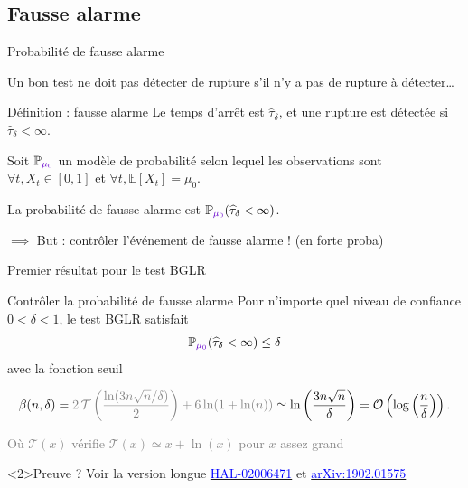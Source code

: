 \documentclass[11pt,french,ignorenonframetext,]{beamer}
\begin{document}
\subsection{\hfill{}Fausse alarme\hfill{}}

\begin{frame}{Probabilité de fausse alarme}

  Un bon test ne doit pas détecter de rupture s'il n'y a pas de rupture à détecter\ldots

  \pause
  \begin{block}{Définition : fausse alarme}
    Le temps d'arrêt est $\widehat{\tau}_\delta$,
    et une rupture est détectée si $\widehat{\tau}_\delta < \infty$.

    Soit $\mathbb{P}_{\textcolor{deeppurple}{\mu_0}}$ un modèle de probabilité selon lequel les observations sont $\forall t, X_t \in[0,1]$
    et \textcolor{deeppurple}{$\forall t, \mathbb{E}[X_t] = \mu_0$}.

    La \alert{probabilité de fausse alarme} est $\mathbb{P}_{\textcolor{deeppurple}{\mu_0}}(\widehat{\tau}_\delta < \infty)$.
  \end{block}

  \alert{$\implies$ But : contrôler l'événement de fausse alarme !} (en forte proba)

\end{frame}

\begin{frame}{Premier résultat pour le test BGLR \dSmiley{}}

  \begin{block}{Contrôler la probabilité de fausse alarme}
    Pour n'importe quel \alert{niveau de confiance} $0<\delta<1$,
    le test BGLR satisfait
    \[ \mathbb{P}_{\textcolor{deeppurple}{\mu_0}}(\widehat{\tau}_\delta < \infty) \leq \delta \]
    avec la fonction seuil
    \begin{small}
      \[ \beta(n,\delta) = \textcolor{gray}{2\,\mathcal{T}\left(\frac{\ln(3n\sqrt{n}/\delta)}{2}\right) + 6\ln(1+\ln(n))} \simeq \ln\left(\frac{3n \sqrt{n}}{\delta}\right) = \mathcal{O}\left(\log\left(\frac{n}{\delta}\right)\right).\]
    \end{small}
    \begin{footnotesize}
      \textcolor{gray}{Où $\mathcal{T}(x)$ vérifie $\mathcal{T}(x)\simeq x + \ln(x)$ pour $x$ assez grand}
    \end{footnotesize}
  \end{block}


  \begin{exampleblock}<2>{Preuve ?}
    Voir la version longue
    \href{https://hal.inria.fr/hal-02006471}{\textcolor{blue}{HAL-02006471}}
    et
    \href{https://arxiv.org/abs/1902.01575}{\textcolor{blue}{arXiv:1902.01575}}
  \end{exampleblock}

\end{frame}
\end{document}
